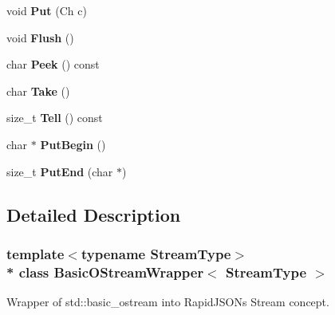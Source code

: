 \begin{DoxyCompactItemize}
\item 
void {\bfseries Put} (Ch c)\hypertarget{class_basic_o_stream_wrapper_a7d3ba9d651fbe27fe05387f512154ea8}{}\label{class_basic_o_stream_wrapper_a7d3ba9d651fbe27fe05387f512154ea8}

\item 
void {\bfseries Flush} ()\hypertarget{class_basic_o_stream_wrapper_a1c48a8b7520b0ab6ca34e665b928b56d}{}\label{class_basic_o_stream_wrapper_a1c48a8b7520b0ab6ca34e665b928b56d}

\item 
char {\bfseries Peek} () const \hypertarget{class_basic_o_stream_wrapper_a81eda65252d99c350d754bb702526dae}{}\label{class_basic_o_stream_wrapper_a81eda65252d99c350d754bb702526dae}

\item 
char {\bfseries Take} ()\hypertarget{class_basic_o_stream_wrapper_a54be63e8d24f4d82329b860a907f65fe}{}\label{class_basic_o_stream_wrapper_a54be63e8d24f4d82329b860a907f65fe}

\item 
size\+\_\+t {\bfseries Tell} () const \hypertarget{class_basic_o_stream_wrapper_ab5f119855c8591b650fbcbeb99be677e}{}\label{class_basic_o_stream_wrapper_ab5f119855c8591b650fbcbeb99be677e}

\item 
char $\ast$ {\bfseries Put\+Begin} ()\hypertarget{class_basic_o_stream_wrapper_a564b7b727bdab12185e7a7bd1ac5e822}{}\label{class_basic_o_stream_wrapper_a564b7b727bdab12185e7a7bd1ac5e822}

\item 
size\+\_\+t {\bfseries Put\+End} (char $\ast$)\hypertarget{class_basic_o_stream_wrapper_a1da108e43a5a517c4484821fced1fca0}{}\label{class_basic_o_stream_wrapper_a1da108e43a5a517c4484821fced1fca0}

\end{DoxyCompactItemize}


\subsection{Detailed Description}
\subsubsection*{template$<$typename Stream\+Type$>$\\*
class Basic\+O\+Stream\+Wrapper$<$ Stream\+Type $>$}

Wrapper of {\ttfamily std\+::basic\+\_\+ostream} into Rapid\+J\+S\+ON\textquotesingle{}s Stream concept. 

